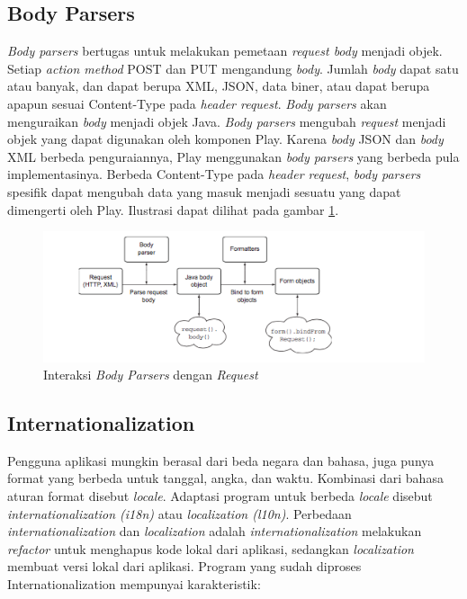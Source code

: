 \subsection{Body Parsers}
\textit{Body parsers} bertugas untuk melakukan pemetaan \textit{request body} menjadi objek. Setiap \textit{action method} POST dan PUT mengandung \textit{body}. Jumlah \textit{body} dapat satu atau banyak, dan dapat berupa XML, JSON, data biner, atau dapat berupa apapun sesuai Content-Type pada \textit{header request}. \textit{Body parsers} akan menguraikan \textit{body} menjadi objek Java. \textit{Body parsers} mengubah \textit{request} menjadi objek yang dapat digunakan oleh komponen Play. Karena \textit{body} JSON dan \textit{body} XML berbeda penguraiannya, Play menggunakan \textit{body parsers} yang berbeda pula implementasinya. Berbeda Content-Type pada \textit{header request}, \textit{body parsers} spesifik dapat mengubah data yang masuk menjadi sesuatu yang dapat dimengerti oleh Play. Ilustrasi dapat dilihat pada gambar \ref{fig:2_play_bodyparsers}.

\begin{figure}[H]
	\centering
	\includegraphics{Gambar/play-bodyparsers}
	\caption{Interaksi \textit{Body Parsers} dengan \textit{Request}} 
	\label{fig:2_play_bodyparsers}
\end{figure}



\subsection{Internationalization}
Pengguna aplikasi mungkin berasal dari beda negara dan bahasa, juga punya format yang berbeda untuk tanggal, angka, dan waktu. Kombinasi dari bahasa aturan format disebut \textit{locale}. Adaptasi program untuk berbeda \textit{locale} disebut \textit{internationalization (i18n)} atau \textit{localization (l10n)}. Perbedaan \textit{internationalization} dan \textit{localization} adalah \textit{internationalization} melakukan \textit{refactor} untuk menghapus kode lokal dari aplikasi, sedangkan \textit{localization} membuat versi lokal dari aplikasi. Program yang sudah diproses Internationalization mempunyai karakteristik:

